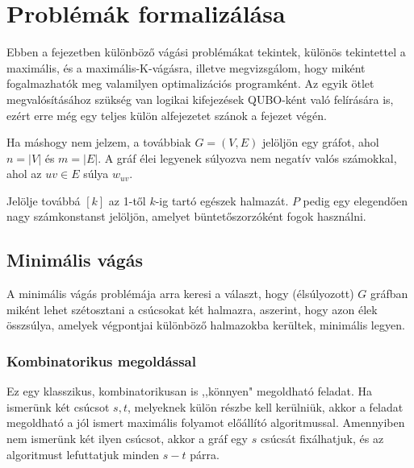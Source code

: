 
\chapter{Problémák formalizálása}\label{chap:cuts}


Ebben a fejezetben különböző vágási problémákat tekintek, különös tekintettel a maximális, és a maximális-K-vágásra, illetve megvizsgálom, hogy miként fogalmazhatók meg valamilyen optimalizációs programként. Az egyik ötlet megvalósításához szükség van logikai kifejezések QUBO-ként való felírására is, ezért erre még egy teljes külön alfejezetet szánok a fejezet végén.

Ha máshogy nem jelzem, a továbbiak $G=(V,E)$ jelöljön egy gráfot, ahol $n=|V|$ és $m=|E|$. A gráf élei legyenek súlyozva nem negatív valós számokkal, ahol az $uv \in E$ súlya $w_{uv}$.

Jelölje továbbá $[k]$ az 1-től $k$-ig tartó egészek halmazát. $P$ pedig egy elegendően nagy számkonstanst jelöljön, amelyet büntetőszorzóként fogok használni.


\section{Minimális vágás}

A minimális vágás problémája arra keresi a választ, hogy (élsúlyozott) $G$ gráfban miként lehet szétosztani a csúcsokat két halmazra, aszerint, hogy azon élek összsúlya, amelyek végpontjai különböző halmazokba kerültek, minimális legyen.

\subsection{Kombinatorikus megoldással}

Ez egy klasszikus, kombinatorikusan is ,,könnyen" megoldható feladat. Ha ismerünk két csúcsot $s, t$, melyeknek külön részbe kell kerülniük, akkor a feladat megoldható a jól ismert maximális folyamot előállító algoritmussal. Amennyiben nem ismerünk két ilyen csúcsot, akkor a gráf egy $s$ csúcsát fixálhatjuk, és az algoritmust lefuttatjuk minden $s-t$ párra.

